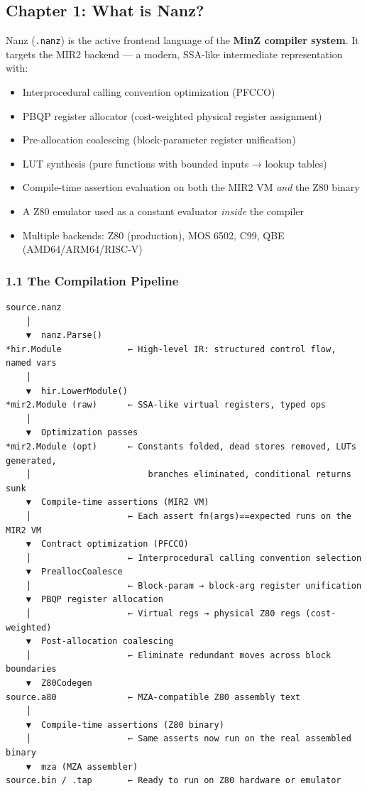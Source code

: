 \documentclass[
  11pt,
  a4paper,
]{report}
\providecommand{\tightlist}{%
  \setlength{\itemsep}{0pt}\setlength{\parskip}{0pt}}
\begin{document}
\subsection{Chapter 1: What is Nanz?}\label{chapter-1-what-is-nanz}

Nanz (\texttt{.nanz}) is the active frontend language of the
\textbf{MinZ compiler system}. It targets the MIR2 backend --- a modern,
SSA-like intermediate representation with:

\begin{itemize}
\tightlist
\item
  Interprocedural calling convention optimization (PFCCO)
\item
  PBQP register allocator (cost-weighted physical register assignment)
\item
  Pre-allocation coalescing (block-parameter register unification)
\item
  LUT synthesis (pure functions with bounded inputs → lookup tables)
\item
  Compile-time assertion evaluation on both the MIR2 VM \emph{and} the
  Z80 binary
\item
  A Z80 emulator used as a constant evaluator \emph{inside} the compiler
\item
  Multiple backends: Z80 (production), MOS 6502, C99, QBE
  (AMD64/ARM64/RISC-V)
\end{itemize}

\subsubsection{1.1 The Compilation
Pipeline}\label{the-compilation-pipeline}

\begin{verbatim}
source.nanz
    │
    ▼  nanz.Parse()
*hir.Module             ← High-level IR: structured control flow, named vars
    │
    ▼  hir.LowerModule()
*mir2.Module (raw)      ← SSA-like virtual registers, typed ops
    │
    ▼  Optimization passes
*mir2.Module (opt)      ← Constants folded, dead stores removed, LUTs generated,
    │                       branches eliminated, conditional returns sunk
    ▼  Compile-time assertions (MIR2 VM)
    │                   ← Each assert fn(args)==expected runs on the MIR2 VM
    ▼  Contract optimization (PFCCO)
    │                   ← Interprocedural calling convention selection
    ▼  PreallocCoalesce
    │                   ← Block-param → block-arg register unification
    ▼  PBQP register allocation
    │                   ← Virtual regs → physical Z80 regs (cost-weighted)
    ▼  Post-allocation coalescing
    │                   ← Eliminate redundant moves across block boundaries
    ▼  Z80Codegen
source.a80              ← MZA-compatible Z80 assembly text
    │
    ▼  Compile-time assertions (Z80 binary)
    │                   ← Same asserts now run on the real assembled binary
    ▼  mza (MZA assembler)
source.bin / .tap       ← Ready to run on Z80 hardware or emulator
\end{verbatim}
\end{document}
